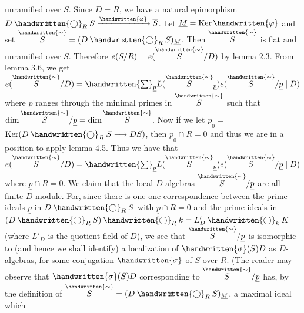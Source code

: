 unramified over $S$. Since $\overline D=\overline R$, we have a natural epimorphism
$D\mathbin{\ooalign{\hfil$\mathrm{x}$\hfil\cr\hfil$\handwritten{\bigcirc}$\hfil\cr}}_R S\xrightarrow{\handwritten{\varphi}}\overline S$. Let $\underline M=\mathrm{Ker}\,\handwritten{\varphi}$ and set $\overset{\handwritten{\sim}}{S}=(D\mathbin{\ooalign{\hfil$\mathrm{x}$\hfil\cr\hfil$\handwritten{\bigcirc}$\hfil\cr}}_R S)_{\underline M}$. Then $\overset{\handwritten{\sim}}{S}$ is flat and
unramified over $S$. Therefore $e(S/R)=e(\overset{\handwritten{\sim}}{S}/D)$ by lemma 2.3. From
lemma 3.6, we get $e(\overset{\handwritten{\sim}}{S}/D)=\handwritten{\sum}_{\underline p}L(\overset{\handwritten{\sim}}{S}_{\underline p})e(\overset{\handwritten{\sim}}{S}/\underline p\mid D)$ where $\underline p$ ranges through the
minimal primes in $\overset{\handwritten{\sim}}{S}$ such that $\dim \overset{\handwritten{\sim}}{S}/\underline p=\dim \overset{\handwritten{\sim}}{S}$. Now if we let $\underline p_0={}$
$\mathrm{Ker}(D\mathbin{\ooalign{\hfil$\mathrm{x}$\hfil\cr\hfil$\handwritten{\bigcirc}$\hfil\cr}}_R S\longrightarrow DS)$, then $\underline p_0\cap R=0$ and thus we are in a position to
apply lemma 4.5. Thus we have that $e(\overset{\handwritten{\sim}}{S}/D)=\handwritten{\sum}_{\underline p}L(\overset{\handwritten{\sim}}{S}_{\underline p})e(\overset{\handwritten{\sim}}{S}/\underline p\mid D)$ where
$\underline p\cap R=0$. We claim that the local $D$-algebras $\overset{\handwritten{\sim}}{S}/\underline p$ are all finite $D$-module.
For, since there is one-one correspondence between the prime ideals $\underline p$ in
$D\mathbin{\ooalign{\hfil$\mathrm{x}$\hfil\cr\hfil$\handwritten{\bigcirc}$\hfil\cr}}_R S$ with $\underline p\cap R=0$ and the prime ideals in $(D\mathbin{\ooalign{\hfil$\mathrm{x}$\hfil\cr\hfil$\handwritten{\bigcirc}$\hfil\cr}}_R S)\mathbin{\ooalign{\hfil$\mathrm{x}$\hfil\cr\hfil$\handwritten{\bigcirc}$\hfil\cr}}_R k=L'_D\mathbin{\ooalign{\hfil$\mathrm{x}$\hfil\cr\hfil$\handwritten{\bigcirc}$\hfil\cr}}_k K$
(where $L'_D$ is the quotient field of $D$), we see that $\overset{\handwritten{\sim}}{S}/\underline p$ is isomorphic to (and
hence we shall identify) a localization of $\handwritten{\sigma}(S)D$ as $D$-algebras, for some
conjugation $\handwritten{\sigma}$ of $S$ over $R$. (The reader may observe that $\handwritten{\sigma}(S)D$ corresponding
to $\overset{\handwritten{\sim}}{S}/\underline p$ has, by the definition of $\overset{\handwritten{\sim}}{S}=(D\mathbin{\ooalign{\hfil$\mathrm{x}$\hfil\cr\hfil$\handwritten{\bigcirc}$\hfil\cr}}_R S)_{\underline M}$, a maximal ideal which
